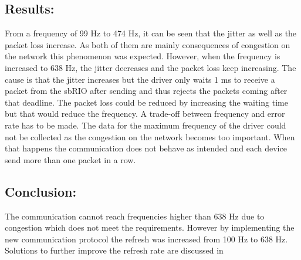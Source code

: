 \subsection*{Results:}

From a frequency of 99 Hz to 474 Hz, it can be seen that the jitter as well as the packet loss increase. As both of them are mainly consequences of congestion on the network\cite{cisco_jitter} this phenomenon was expected. However, when the frequency is increased to 638 Hz, the jitter decreases and the packet loss keep increasing. The cause is that the jitter increases but the driver only waits 1 ms to receive a packet from the sbRIO after sending and thus rejects the packets coming after that deadline. The packet loss could be reduced by increasing the waiting time but that would reduce the frequency. A trade-off between frequency and error rate has to be made.
The data for the maximum frequency of the driver could not be collected as the congestion on the network becomes too important. When that happens the communication does not behave as intended and each device send more than one packet in a row.

\subsection*{Conclusion:}

The communication cannot reach frequencies higher than 638 Hz due to congestion which does not meet the requirements. However by implementing the new communication protocol the refresh was increased from 100 Hz to 638 Hz. Solutions to further improve the refresh rate are discussed in 
